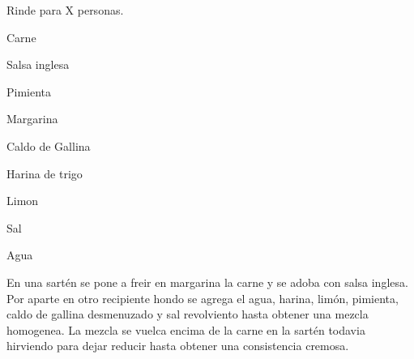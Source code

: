 
Rinde para X personas.


\begin{ingredientes}
\item Carne
\item Salsa inglesa
\item Pimienta
\item Margarina
\item Caldo de Gallina
\item Harina de trigo
\item Limon
\item Sal
\item Agua
\end{ingredientes}
\preparacion
En una sartén se pone a freir en margarina la carne y se adoba con salsa inglesa. \\

Por aparte en otro recipiente hondo se agrega el agua, harina, limón, pimienta, caldo de gallina desmenuzado y sal revolviento hasta obtener una mezcla homogenea. La mezcla se vuelca encima de la carne en la sartén todavia hirviendo para dejar reducir hasta obtener una consistencia cremosa.
